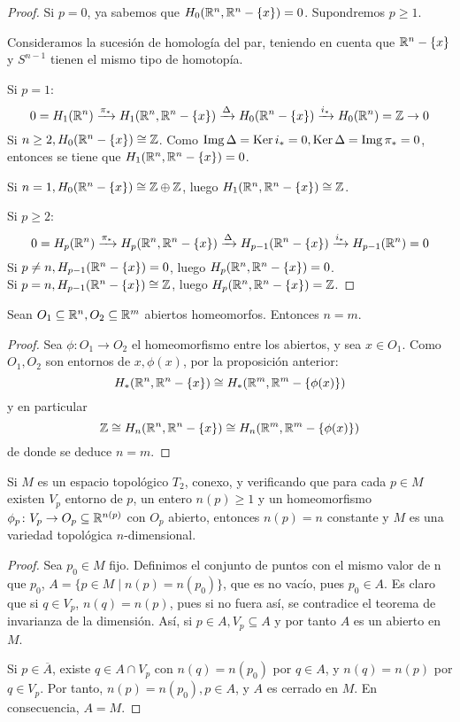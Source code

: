 \begin{proof}
  Si $p = 0$, ya sabemos que $H_0(\mathbb{R}^n, \mathbb{R}^n - \{x\}) = 0$. Supondremos $p \geq 1$.

  Consideramos la sucesión de homología del par, teniendo en cuenta que $\mathbb{R}^n - \{x\}$ y $S^{n-1}$ tienen el mismo tipo de homotopía.

  Si $p = 1$:
  \[ 0 = H_1(\mathbb{R}^n) \xrightarrow{\pi_*} H_1(\mathbb{R}^n, \mathbb{R}^n - \{x\}) \xrightarrow{\Delta} H_0(\mathbb{R}^n - \{x\}) \xrightarrow{i_*} H_0(\mathbb{R}^n) = \mathbb{Z} \to 0 \]
  Si $n \geq 2, H_0(\mathbb{R}^n - \{x\}) \cong \mathbb{Z}$. Como $\operatorname{Img} \Delta = \operatorname{Ker} i_* = 0, \operatorname{Ker} \Delta = \operatorname{Img} \pi_* = 0$, entonces se tiene que
  $H_1(\mathbb{R}^n, \mathbb{R}^n - \{x\}) = 0$.

  Si $n = 1, H_0(\mathbb{R}^n - \{x\}) \cong \mathbb{Z} \oplus \mathbb{Z}$, luego $H_1(\mathbb{R}^n, \mathbb{R}^n - \{x\}) \cong \mathbb{Z}$.

  Si $p \geq 2$:
  \[ 0 = H_p(\mathbb{R}^n) \xrightarrow{\pi_*} H_p(\mathbb{R}^n, \mathbb{R}^n - \{x\}) \xrightarrow{\Delta} H_{p-1}(\mathbb{R}^n - \{x\}) \xrightarrow{i_*} H_{p-1}(\mathbb{R}^n) = 0 \]
  Si $p \neq n, H_{p-1}(\mathbb{R}^n - \{x\}) = 0$, luego $H_p(\mathbb{R}^n, \mathbb{R}^n - \{x\}) = 0$. \\
  Si $p = n, H_{p-1}(\mathbb{R}^n - \{x\}) \cong \mathbb{Z}$, luego  $H_p(\mathbb{R}^n, \mathbb{R}^n - \{x\}) = \mathbb{Z}$.
\end{proof}

\begin{theorem}
  Sean $O_1 \subseteq \mathbb{R}^n, O_2 \subseteq \mathbb{R}^m$ abiertos homeomorfos. Entonces $n = m$.
\end{theorem}

\begin{proof}
  Sea $\phi \colon O_1 \to O_2$ el homeomorfismo entre los abiertos, y sea $x \in O_1$. Como $O_1, O_2$ son entornos de $x, \phi(x)$,
  por la proposición anterior:
  \[H_*(\mathbb{R}^n, \mathbb{R}^n - \{x\}) \cong H_*(\mathbb{R}^m, \mathbb{R}^m - \{\phi(x)\}) \]
  y en particular
  \[ \mathbb{Z} \cong H_n(\mathbb{R}^n, \mathbb{R}^n - \{x\}) \cong H_n(\mathbb{R}^m, \mathbb{R}^m - \{\phi(x)\}) \]
  de donde se deduce $n = m$.
\end{proof}

\begin{corollary}
  Si $M$ es un espacio topológico $T_2$, conexo, y verificando que para cada $p \in M$ existen $V_p$ entorno de $p$, un entero
  $n(p) \geq 1$ y un homeomorfismo $\phi_p \colon V_p \to O_p \subseteq \mathbb{R}^{n(p)}$ con $O_p$ abierto, entonces
  $n(p) = n$ constante y $M$ es una variedad topológica $n$-dimensional.
\end{corollary}

\begin{proof}
  Sea $p_0 \in M$ fijo. Definimos el conjunto de puntos con el mismo valor de n que $p_0$, $A = \{p \in M \mid n(p) = n(p_0)\}$,
  que es no vacío, pues $p_0 \in A$. Es claro que si $q \in V_p$, $n(q) = n(p)$, pues si no fuera así, se contradice el teorema
  de invarianza de la dimensión. Así, si $p \in A, V_p \subseteq A$ y por tanto $A$ es un abierto en $M$.

  Si $p \in \overline{A}$, existe $q \in A \cap V_p$ con $n(q) = n(p_0)$ por $q \in A$, y $n(q) = n(p)$ por $q \in V_p$.
  Por tanto, $n(p) = n(p_0), p \in A$, y $A$ es cerrado en $M$. En consecuencia, $A = M$.
\end{proof}

